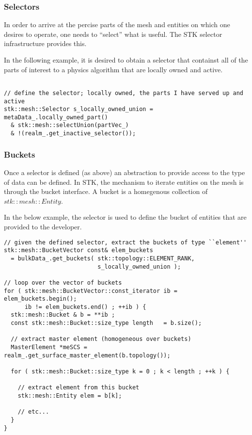 \subsubsection{Selectors}
In order to arrive at the percise parts of the mesh and entities on which one desires
to operate, one needs to ``select'' what is useful. The STK selector infrastructure provides this.

In the following example, it is desired to obtain a selector that containst all of the parts of 
interest to a physics algorithm that are locally owned and active.

\begin{lstlisting}

// define the selector; locally owned, the parts I have served up and active
stk::mesh::Selector s_locally_owned_union = metaData_.locally_owned_part()
  & stk::mesh::selectUnion(partVec_) 
  & !(realm_.get_inactive_selector());

\end{lstlisting}

\subsubsection{Buckets}
Once a selector is defined (as above) an abstraction to provide access to the type of 
data can be defined. In STK, the mechanism to iterate entities on the mesh is through the 
bucket interface. A bucket is a homegenous collection of $stk::mesh::Entity$.

In the below example, the selector is used to define the bucket of entities that are provided
to the developer.

\begin{lstlisting}
// given the defined selector, extract the buckets of type ``element''
stk::mesh::BucketVector const& elem_buckets 
  = bulkData_.get_buckets( stk::topology::ELEMENT_RANK, 
                           s_locally_owned_union );

// loop over the vector of buckets 
for ( stk::mesh::BucketVector::const_iterator ib = elem_buckets.begin();
      ib != elem_buckets.end() ; ++ib ) {
  stk::mesh::Bucket & b = **ib ;
  const stk::mesh::Bucket::size_type length   = b.size();

  // extract master element (homogeneous over buckets)
  MasterElement *meSCS = realm_.get_surface_master_element(b.topology());
  
  for ( stk::mesh::Bucket::size_type k = 0 ; k < length ; ++k ) {
    
    // extract element from this bucket
    stk::mesh::Entity elem = b[k];
    
    // etc...
  }
}

\end{lstlisting}

